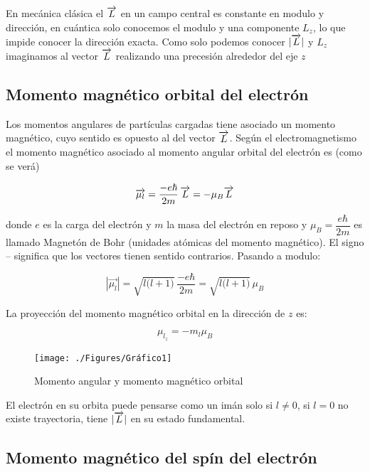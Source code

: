 En mecánica clásica el $\overrightarrow{L}$ en un campo central es constante en modulo y dirección, en cuántica solo conocemos el modulo y una componente $L_{z}$, lo que impide conocer la dirección exacta.
Como solo podemos conocer $|\overrightarrow{L}|$ y $L_{z}$ imaginamos al vector $\overrightarrow{L}$ realizando una precesión alrededor del eje $z$




\subsection{Momento magnético orbital del electrón}

Los momentos angulares de partículas cargadas tiene asociado un momento magnético, cuyo sentido es opuesto al del vector $\overrightarrow{L}$. Según el electromagnetismo el momento magnético asociado al momento angular orbital del electrón es (como se verá)

\begin{equation}
	\overrightarrow{\mu_{l}} = \frac{-e\hbar}{2m} \, \overrightarrow{L}= -\mu_{B} \overrightarrow{L}
\end{equation}

donde $e$ es la carga del electrón y $m$ la masa del electrón en reposo y $\mu_{B}=\dfrac{e\hbar}{2m}$ es llamado Magnetón de Bohr (unidades atómicas del momento magnético). El signo $–$ significa que los vectores tienen sentido contrarios. Pasando a modulo:

\begin{equation}
 |\overrightarrow{\mu_{l}}| = \sqrt{l \big(l+1\big) } \,  \frac{-e\hbar}{2m} = \sqrt{l \big(l+1\big) } \, \mu_{B} 
\end{equation}

La proyección del momento magnético orbital en la dirección de $z$ es:

\begin{equation}
	\mu_{l_{z}} = -m_{l}\mu_{B}
\end{equation}

\begin{figure}[H]
    \centering
    \texttt{[image: ./Figures/Gráfico1]}
	\caption{Momento angular y momento magnético orbital}
	\label{fig:Grafico1}
 \end{figure}

El electrón en su orbita puede pensarse como un imán solo si $l\neq 0$, si $l=0$ no existe trayectoria, tiene $\vert\overrightarrow{L}\vert$ en su estado fundamental.


\subsection{Momento magnético del spín del electrón}

